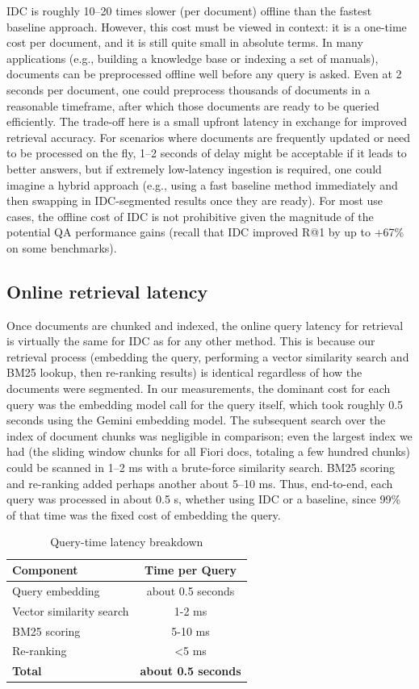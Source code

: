 \documentclass[12pt,a4paper]{report}
\begin{document}
IDC is roughly 10--20 times slower (per document) offline than the fastest baseline approach. However, this cost must be viewed in context: it is a one-time cost per document, and it is still quite small in absolute terms. In many applications (e.g., building a knowledge base or indexing a set of manuals), documents can be preprocessed offline well before any query is asked. Even at 2 seconds per document, one could preprocess thousands of documents in a reasonable timeframe, after which those documents are ready to be queried efficiently. The trade-off here is a small upfront latency in exchange for improved retrieval accuracy. For scenarios where documents are frequently updated or need to be processed on the fly, 1--2 seconds of delay might be acceptable if it leads to better answers, but if extremely low-latency ingestion is required, one could imagine a hybrid approach (e.g., using a fast baseline method immediately and then swapping in IDC-segmented results once they are ready). For most use cases, the offline cost of IDC is not prohibitive given the magnitude of the potential QA performance gains (recall that IDC improved R@1 by up to +67\% on some benchmarks).

\subsection{Online retrieval latency}\label{sec:online-latency}

Once documents are chunked and indexed, the online query latency for retrieval is virtually the same for IDC as for any other method. This is because our retrieval process (embedding the query, performing a vector similarity search and BM25 lookup, then re-ranking results) is identical regardless of how the documents were segmented. In our measurements, the dominant cost for each query was the embedding model call for the query itself, which took roughly 0.5 seconds using the Gemini embedding model. The subsequent search over the index of document chunks was negligible in comparison; even the largest index we had (the sliding window chunks for all Fiori docs, totaling a few hundred chunks) could be scanned in 1--2 ms with a brute-force similarity search. BM25 scoring and re-ranking added perhaps another about 5--10 ms. Thus, end-to-end, each query was processed in about 0.5 s, whether using IDC or a baseline, since 99\% of that time was the fixed cost of embedding the query.

\begin{table}[h!]
\centering
\caption{Query-time latency breakdown}
\label{tab:query_latency}
\begin{tabular}{lc}
\hline
\textbf{Component} & \textbf{Time per Query} \\
\hline
Query embedding & about 0.5 seconds \\
Vector similarity search & 1-2 ms \\
BM25 scoring & 5-10 ms \\
Re-ranking & <5 ms \\
\hline
\textbf{Total} & \textbf{about 0.5 seconds} \\
\hline
\end{tabular}
\end{table}
\end{document}

